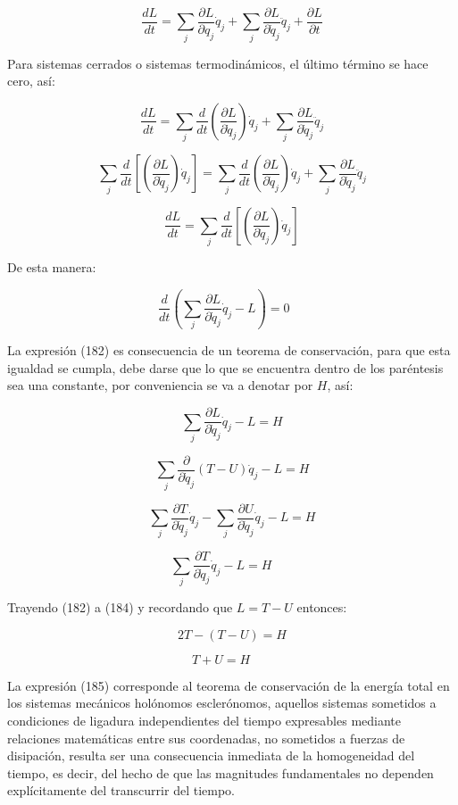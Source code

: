 \documentclass[]{article}
\begin{document}
\[\frac{dL}{dt} = \sum_{j}^{}{\frac{\partial L}{\partial q_{j}}{\dot{q}}_{j}} + \sum_{j}^{}{\frac{\partial L}{\partial{\dot{q}}_{j}}{\ddot{q}}_{j}} + \frac{\partial L}{\partial t}\]

Para sistemas cerrados o sistemas termodinámicos, el último término se
hace cero, así:

\[\frac{dL}{dt} = \sum_{j}^{}{\frac{d}{dt}\left( \frac{\partial L}{\partial{\dot{q}}_{j}} \right){\dot{q}}_{j}} + \sum_{j}^{}{\frac{\partial L}{\partial{\dot{q}}_{j}}{\ddot{q}}_{j}}\]

\[\sum_{j}^{}{\frac{d}{dt}\left\lbrack \left( \frac{\partial L}{\partial{\dot{q}}_{j}} \right){\dot{q}}_{j} \right\rbrack} = \sum_{j}^{}{\frac{d}{dt}\left( \frac{\partial L}{\partial{\dot{q}}_{j}} \right){\dot{q}}_{j}} + \sum_{j}^{}{\frac{\partial L}{\partial{\dot{q}}_{j}}{\ddot{q}}_{j}}\]

\[\frac{dL}{dt} = \sum_{j}^{}{\frac{d}{dt}\left\lbrack \left( \frac{\partial L}{\partial{\dot{q}}_{j}} \right){\dot{q}}_{j} \right\rbrack}\]

De esta manera:

\[\frac{d}{dt}\left( \sum_{j}^{}{\frac{\partial L}{\partial{\dot{q}}_{j}}{\dot{q}}_{j} - L} \right) = 0\ \ \ \ \ \ \]

La expresión (182) es consecuencia de un teorema de conservación, para
que esta igualdad se cumpla, debe darse que lo que se encuentra dentro
de los paréntesis sea una constante, por conveniencia se va a denotar
por \(H\), así:

\[\sum_{j}^{}{\frac{\partial L}{\partial{\dot{q}}_{j}}{\dot{q}}_{j} - L} = H\]

\[\sum_{j}^{}{\frac{\partial}{\partial{\dot{q}}_{j}}(T - U){\dot{q}}_{j} - L} = H\]

\[\sum_{j}^{}{\frac{\partial T}{\partial{\dot{q}}_{j}}{\dot{q}}_{j} - \sum_{j}^{}{\frac{\partial U}{\partial{\dot{q}}_{j}}{\dot{q}}_{j} -}L} = H\]

\[\sum_{j}^{}{\frac{\partial T}{\partial{\dot{q}}_{j}}{\dot{q}}_{j} - L} = H\ \ \ \ \ \ \ \ \]

Trayendo (182) a (184) y recordando que \(L = T - U\) entonces:

\[2T - (T - U) = H\]

\[T + U = H\ \ \ \ \ \ \ \ \]

La expresión (185) corresponde al teorema de conservación de la energía
total en los sistemas mecánicos holónomos esclerónomos, aquellos
sistemas sometidos a condiciones de ligadura independientes del tiempo
expresables mediante relaciones matemáticas entre sus coordenadas, no
sometidos a fuerzas de disipación, resulta ser una consecuencia
inmediata de la homogeneidad del tiempo, es decir, del hecho de que las
magnitudes fundamentales no dependen explícitamente del transcurrir del
tiempo.
\end{document}

